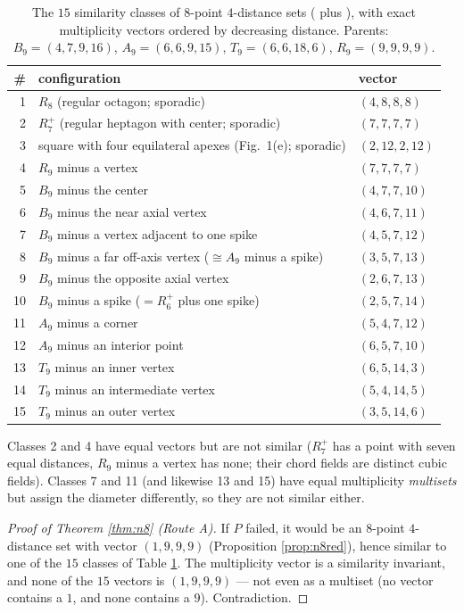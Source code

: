 \documentclass[11pt]{article}
\theoremstyle{definition}
\theoremstyle{remark}
\begin{document}
\begin{table}[ht]
\centering
\caption{The $15$ similarity classes of $8$-point $4$-distance sets
(\cite[Theorem~1.2(a)]{Shinohara08} plus \cite[Theorem~1]{ErFi96}), with exact
multiplicity vectors ordered by decreasing distance. Parents: $B_9 = (4,7,9,16)$,
$A_9 = (6,6,9,15)$, $T_9 = (6,6,18,6)$, $R_9 = (9,9,9,9)$.}
\label{tab:e84}
\begin{tabular}{@{}rll@{}}
\toprule
\# & configuration & vector \\
\midrule
1 & $R_8$ (regular octagon; sporadic) & $(4,8,8,8)$ \\
2 & $R_7^+$ (regular heptagon with center; sporadic) & $(7,7,7,7)$ \\
3 & square with four equilateral apexes (Fig.~1(e); sporadic) & $(2,12,2,12)$ \\
4 & $R_9$ minus a vertex & $(7,7,7,7)$ \\
5 & $B_9$ minus the center & $(4,7,7,10)$ \\
6 & $B_9$ minus the near axial vertex & $(4,6,7,11)$ \\
7 & $B_9$ minus a vertex adjacent to one spike & $(4,5,7,12)$ \\
8 & $B_9$ minus a far off-axis vertex ($\cong A_9$ minus a spike) & $(3,5,7,13)$ \\
9 & $B_9$ minus the opposite axial vertex & $(2,6,7,13)$ \\
10 & $B_9$ minus a spike ($= R_6^+$ plus one spike) & $(2,5,7,14)$ \\
11 & $A_9$ minus a corner & $(5,4,7,12)$ \\
12 & $A_9$ minus an interior point & $(6,5,7,10)$ \\
13 & $T_9$ minus an inner vertex & $(6,5,14,3)$ \\
14 & $T_9$ minus an intermediate vertex & $(5,4,14,5)$ \\
15 & $T_9$ minus an outer vertex & $(3,5,14,6)$ \\
\bottomrule
\end{tabular}
\end{table}

Classes 2 and 4 have equal vectors but are not similar ($R_7^+$ has a point with seven
equal distances, $R_9$ minus a vertex has none; their chord fields are distinct cubic
fields). Classes 7 and 11 (and likewise 13 and 15) have equal multiplicity
\emph{multisets} but assign the diameter differently, so they are not similar either.

\begin{proof}[Proof of Theorem \ref{thm:n8} (Route A)]
If $P$ failed, it would be an $8$-point $4$-distance set with vector $(1,9,9,9)$
(Proposition \ref{prop:n8red}), hence similar to one of the $15$ classes of Table
\ref{tab:e84}. The multiplicity vector is a similarity invariant, and none of the $15$
vectors is $(1,9,9,9)$ --- not even as a multiset (no vector contains a $1$, and none
contains a $9$). Contradiction.
\end{proof}
\end{document}
